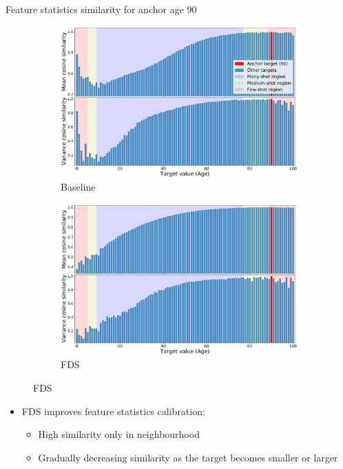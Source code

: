\begin{frame}{Feature statistics similarity for anchor age 90}
	\begin{figure}[h]
		\begin{subfigure}{0.48\textwidth}
			\includegraphics[width=\linewidth]{images/feat_sim_fds_base_90.pdf}
			\caption{Baseline}
		\end{subfigure}\hspace{1em}%
		\begin{subfigure}{0.48\textwidth}
			\includegraphics[width=\linewidth]{images/feat_sim_fds_ours_90.pdf}
			\caption{FDS}
		\end{subfigure}
	\end{figure}
	\begin{itemize}
		\item FDS improves feature statistics calibration:
		\begin{itemize}
			\item High similarity only in neighbourhood
			\item Gradually decreasing similarity as the target becomes smaller or larger
		\end{itemize}
	\end{itemize}
\end{frame}

